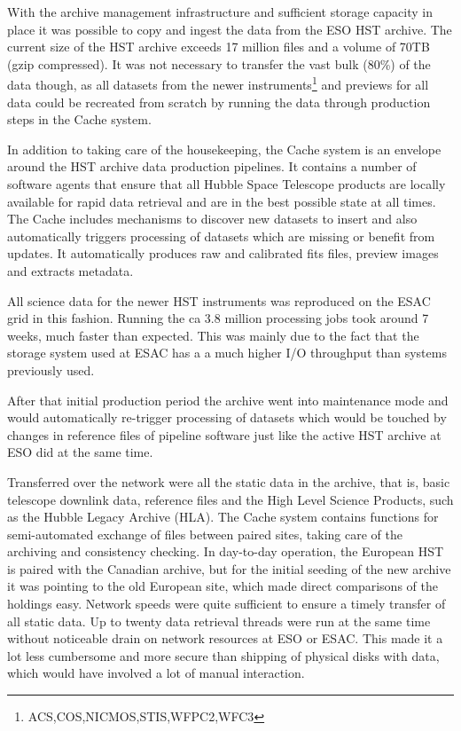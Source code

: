 \documentclass[11pt,twoside]{article}  %
\begin{document}
With the archive management infrastructure and sufficient storage capacity in place it was possible to copy and ingest the data from the ESO HST archive.
The current size of the HST archive exceeds 17 million files and a volume of 70TB (gzip compressed). 
It was not necessary to transfer the vast bulk (80\%) of the data though, as all datasets from the newer instruments\footnote{ACS,COS,NICMOS,STIS,WFPC2,WFC3} and previews for all data could be recreated from scratch by running the data through production steps in the Cache system. 

In addition to taking care of the housekeeping, the Cache system is an envelope around the HST archive data production pipelines. It contains a number of software agents that ensure that all Hubble Space Telescope products are locally available for rapid data retrieval and are in the best possible state at all times.  
The Cache includes mechanisms to discover new datasets to insert and also automatically triggers processing of datasets which are missing or benefit from updates.
It automatically produces raw and calibrated fits files, preview images and extracts metadata.

All science data for the newer HST instruments was reproduced on the ESAC grid in this fashion. 
Running the ca 3.8 million processing jobs took around 7 weeks, much faster than expected. This was mainly due to the fact that the storage system used at ESAC has a a much higher I/O throughput than systems previously used.

After that initial production period the archive went into maintenance mode and would automatically re-trigger processing of datasets which would be touched by changes in reference files of pipeline software just like the active HST archive at ESO did at the same time.

Transferred over the network were all the static data in the archive, that
is, basic telescope downlink data, reference
files and the High Level Science Products, such as the Hubble Legacy
Archive (HLA).
The  Cache system contains functions for semi-automated exchange of files between paired sites, taking care of the archiving and consistency checking. In day-to-day operation, the European HST is paired with the Canadian archive, but for the initial seeding of the new archive  it was pointing to the old European site, which made direct comparisons of the holdings easy. 
Network speeds were quite sufficient to ensure a timely transfer of all static data. Up to twenty data retrieval threads were run at the same time without noticeable drain on network resources at ESO or ESAC. This made it a lot less cumbersome and more secure than shipping of physical disks with data, which would have involved a lot of manual interaction.
\end{document}
